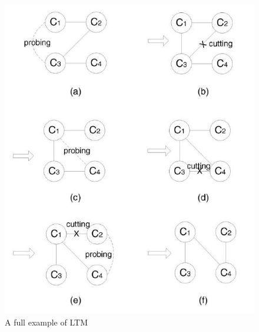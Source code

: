 \documentclass[a4paper,10pt]{article}
\begin{document}
\begin{figure}
\centering
  \includegraphics[scale=0.4]{img/ltm_example.jpeg}
\caption{A full example of LTM}
\label{figure:ltm_example}
\end{figure}
\end{document}
